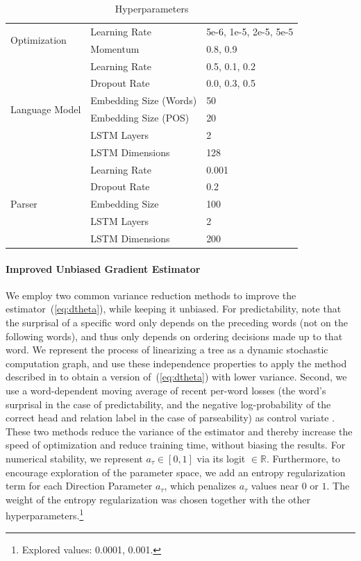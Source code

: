 \documentclass[10pt,twoside,lineno]{article}
\begin{document}
\begin{table}[]
    \centering
    \begin{tabular}{|l|l|l|}
\hline
\multirow{2}{*}{Optimization}&    Learning Rate     & 5e-6, 1e-5, 2e-5, 5e-5 \\
&    Momentum & 0.8, 0.9 \\ \hline
\multirow{6}{*}{Language Model} &    Learning Rate  & 0.5, 0.1, 0.2 \\
&    Dropout Rate& 0.0, 0.3, 0.5 \\
& Embedding Size (Words) & 50 \\
& Embedding Size (POS) & 20 \\
&    LSTM Layers  & 2 \\
&    LSTM Dimensions  & 128 \\
 \hline
\multirow{5}{*}{Parser}&    Learning Rate  & 0.001 \\
&    Dropout Rate  & 0.2 \\
&    Embedding Size  & 100 \\
&    LSTM Layers  & 2 \\
&    LSTM Dimensions  & 200 \\
\hline
    \end{tabular}
    \caption{Hyperparameters}
    \label{tab:hyperparameters}
\end{table}

\paragraph{Improved Unbiased Gradient Estimator}
We employ two common variance reduction methods to improve the estimator~(\ref{eq:dtheta}), while keeping it unbiased.
For predictability, note that the surprisal of a specific word only depends on the preceding words (not on the following words), and thus only depends on ordering decisions made up to that word.
We represent the process of linearizing a tree as a dynamic stochastic computation graph, and use these independence properties to apply the method described in \citet{schulman2015gradient} to obtain a version of~(\ref{eq:dtheta}) with lower variance.
Second, we use a word-dependent moving average of recent per-word losses (the word's surprisal in the case of predictability, and the negative log-probability of the correct head and relation label in the case of parseability) as control variate \cite{williams1992simple}.
These two methods reduce the variance of the estimator and thereby increase the speed of optimization and reduce training time, without biasing the results.
For numerical stability, we represent $a_\tau \in [0,1]$ via its logit $\in \mathbb{R}$.
Furthermore, to encourage exploration of the parameter space, we add an entropy regularization term \citep{xu2015show} for each Direction Parameter $a_\tau$, which penalizes $a_\tau$ values near $0$ or $1$. The weight of the entropy regularization was chosen together with the other hyperparameters.\footnote{Explored values: 0.0001, 0.001.}
\end{document}
